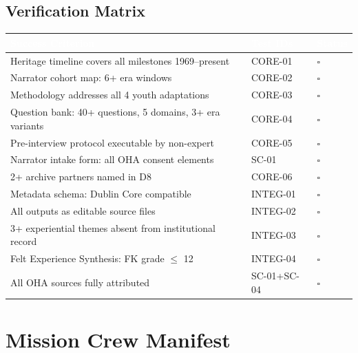 \documentclass[11pt,letterpaper]{article}
\newcommand{\tableheader}[1]{\textbf{\sffamily\textcolor{white}{#1}}}
\begin{document}
\subsection{Verification Matrix}

\begin{center}
\begin{tabularx}{\textwidth}{L{5cm}L{2.5cm}C{2cm}}
\toprule
{}
\tableheader{Success Criterion} & \tableheader{Test IDs} & \tableheader{Status} \\
\midrule
Heritage timeline covers all milestones 1969--present & CORE-01 & $\square$ \\
Narrator cohort map: 6+ era windows & CORE-02 & $\square$ \\
Methodology addresses all 4 youth adaptations & CORE-03 & $\square$ \\
Question bank: 40+ questions, 5 domains, 3+ era variants & CORE-04 & $\square$ \\
Pre-interview protocol executable by non-expert & CORE-05 & $\square$ \\
Narrator intake form: all OHA consent elements & SC-01 & $\square$ \\
2+ archive partners named in D8 & CORE-06 & $\square$ \\
Metadata schema: Dublin Core compatible & INTEG-01 & $\square$ \\
All outputs as editable source files & INTEG-02 & $\square$ \\
3+ experiential themes absent from institutional record & INTEG-03 & $\square$ \\
Felt Experience Synthesis: FK grade $\leq$ 12 & INTEG-04 & $\square$ \\
All OHA sources fully attributed & SC-01+SC-04 & $\square$ \\
\bottomrule
\end{tabularx}
\end{center}

\section{Mission Crew Manifest}
\end{document}
